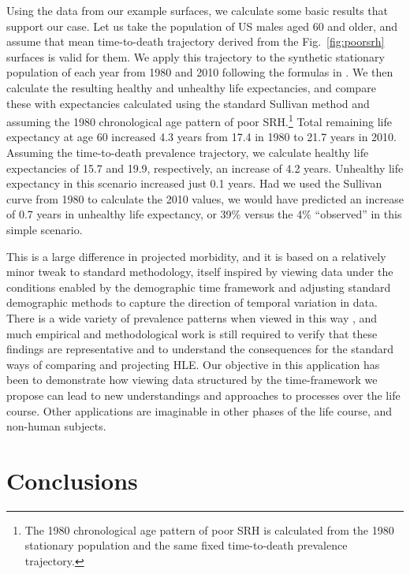\documentclass[12pt,oneside,a4paper]{article} %
\theoremstyle{definition}
\begin{document}
Using the data from our example surfaces, we calculate some basic results that support our case. Let us take the population of US males aged 60 and older, and
assume that mean time-to-death trajectory derived from the
Fig.~\ref{fig:poorsrh} surfaces is valid for them.
We apply this trajectory to the synthetic stationary population of each
year from 1980 and 2010  following the formulas in
\cite{vanRaalte2015HLE}. We then calculate the resulting healthy and unhealthy
life expectancies, and compare these with expectancies calculated using the
standard Sullivan method and assuming the 1980 chronological age
pattern of poor SRH.\footnote{The 1980 chronological age pattern of poor SRH is
calculated from the 1980 stationary population and the same fixed time-to-death
prevalence trajectory.} Total remaining life expectancy at
age 60 increased 4.3 years from 17.4 in 1980 to 21.7 years in 2010.
Assuming the time-to-death prevalence trajectory, we calculate
healthy life expectancies of 15.7 and 19.9, respectively, an increase of 4.2 years. Unhealthy life expectancy in this scenario increased just 0.1 years. Had we used the Sullivan curve from 1980 to
calculate the 2010 values, we would have predicted an increase of 0.7 years in
unhealthy life expectancy, or 39\% versus the 4\% ``observed'' in this simple
scenario.

This is a large difference in projected morbidity, and it is based on a
relatively minor tweak to standard methodology, itself inspired by viewing data under the conditions
enabled by the demographic time framework and adjusting standard demographic
methods to capture the direction of temporal variation in data. There is a wide variety
of prevalence patterns when viewed in this way \citep{riffe2016ttd,
wolf2015disability}, and much empirical and methodological work is still required to verify
that these findings are representative and to understand the consequences for
the standard ways of comparing and projecting HLE. Our objective in this application has been
to demonstrate how viewing data structured by the
time-framework we propose can lead to new understandings and approaches to
processes over the life course. Other applications are imaginable in other
phases of the life course, and non-human subjects.

\section{Conclusions}
\end{document}
